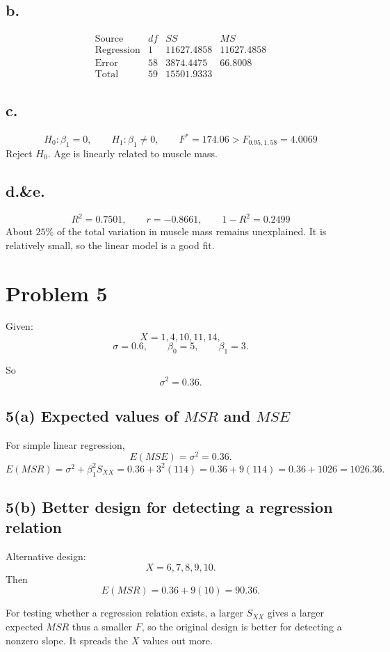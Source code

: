 \documentclass[11pt]{article}
\begin{document}
\subsection*{b.}
\[
\begin{array}{l|ccc}
\text{Source} & df & SS & MS\\ \hline
\text{Regression} & 1 & 11627.4858 & 11627.4858\\
\text{Error} & 58 & 3874.4475 & 66.8008\\
\text{Total} & 59 & 15501.9333 &
\end{array}
\]
\subsection*{c.}
\[
H_0:\beta_1=0,\qquad H_1:\beta_1\ne0,\qquad F^*=174.06>F_{0.95,1,58}=4.0069
\]
Reject \(H_0\). Age is linearly related to muscle mass.
\subsection*{d.\&e.}
\[
R^2=0.7501,\qquad r=-0.8661,\qquad 1-R^2=0.2499
\]
About \(25\%\) of the total variation in muscle mass remains unexplained. It is relatively small, so the linear model is a good fit.

\section*{Problem 5}

Given:
\[
X=1,4,10,11,14,
\]
\[
\sigma=0.6,\qquad \beta_0=5,\qquad \beta_1=3.
\]

So
\[
\sigma^2=0.36.
\]

\subsection*{5(a) Expected values of \(MSR\) and \(MSE\)}

For simple linear regression,
\[
E(MSE)=\sigma^2=0.36.
\]
\[
E(MSR)=\sigma^2+\beta_1^2 S_{XX}=0.36+3^2(114)
=0.36+9(114)
=0.36+1026
=1026.36.
\]

\subsection*{5(b) Better design for detecting a regression relation}

Alternative design:
\[
X=6,7,8,9,10.
\]
Then
\[
E(MSR)=0.36+9(10)=90.36.
\]

For testing whether a regression relation exists, a larger \(S_{XX}\) gives a larger expected \(MSR\) thus a smaller \(F\), so the original design is better for detecting a nonzero slope. It spreads the \(X\) values out more.
\end{document}
